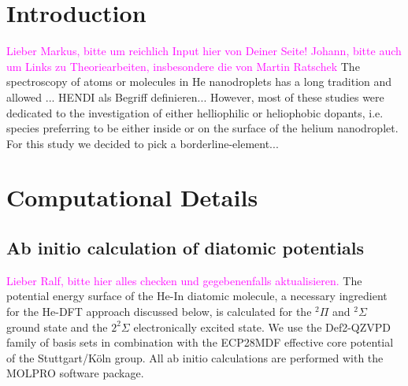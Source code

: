 \documentclass[twoside,twocolumn,9pt]{article}
\def\hl#1{\textcolor{magenta}{#1}}  %
\begin{document}
\renewcommand*\rmdefault{bch}\normalfont\upshape
\rmfamily
\section*{}
\vspace{-1cm}





\section{Introduction}
\hl{Lieber Markus, bitte um reichlich Input hier von Deiner Seite! Johann, bitte auch um Links zu Theoriearbeiten, insbesondere die von Martin Ratschek}
The spectroscopy of atoms or molecules in He nanodroplets has a long tradition and allowed ... 
HENDI als Begriff definieren...
However, most of these studies were dedicated to the investigation of either helliophilic or heliophobic dopants, i.e. species preferring to be either inside or on the surface of the helium nanodroplet. 
For this study we decided to pick a borderline-element...


\section{Computational Details}

\subsection{Ab initio calculation of diatomic potentials}
\hl{Lieber Ralf, bitte hier alles checken und gegebenenfalls aktualisieren.}
The potential energy surface of the He-In diatomic molecule, a necessary ingredient for the He-DFT approach discussed below, is calculated for the $^2\Pi{}$ and $^2\Sigma$ ground state and the $2^2\Sigma{}$ electronically excited state. We use the Def2-QZVPD family of basis sets \cite{Rappoport2010} in combination with the ECP28MDF effective core potential of the Stuttgart/K\"oln group.\cite{Metz2000}  All ab initio calculations are performed with the MOLPRO software package.\cite{MOLPRO}
\end{document}
